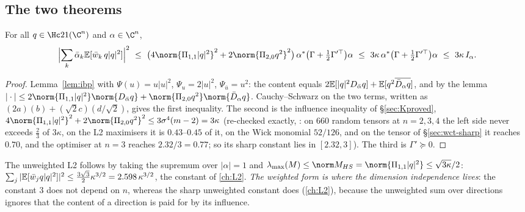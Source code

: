 \subsection{The two theorems}\label{sec:wct-thm}
\begin{theorem}\label{thm:W}
For all $q\in\Hc21(\C^n)$ and $\alpha\in\C^n$,
\[
\Bigl|\sum_k\bar\alpha_k\E[\bar w_k\,q|q|^2]\Bigr|^2\ \le\ \bigl(4\norm{\Pi_{1,1}|q|^2}^2+2\norm{\Pi_{2,0}q^2}^2\bigr)\,\alpha^*\bigl(\Gamma+\tfrac12\Gamma'^{\top}\bigr)\alpha\ \le\ 3\kappa\,\alpha^*\bigl(\Gamma+\tfrac12\Gamma'^{\top}\bigr)\alpha\ \le\ 3\kappa\,I_\alpha .
\]
\end{theorem}
\begin{proof}
Lemma~\ref{lem:ibp} with $\Psi(u)=u|u|^2$, $\Psi_u=2|u|^2$, $\Psi_{\bar u}=u^2$: the content equals $2\mathbb E[|q|^2D_{\bar\alpha}q]+\mathbb E[q^2\overline{\bar D_\alpha q}]$, and by the lemma
$|\cdot|\le2\norm{\Pi_{1,1}|q|^2}\norm{D_{\bar\alpha}q}+\norm{\Pi_{2,0}q^2}\norm{\bar D_\alpha q}$. Cauchy--Schwarz on the two terms, written as
$(2a)(b)+(\sqrt2c)(d/\sqrt2)$, gives the first inequality. The second is the influence inequality of \S\ref{sec:Kproved}, $4\norm{\Pi_{1,1}|q|^2}^2+2\norm{\Pi_{2,0}q^2}^2\le3\sigma^4(m-2)=3\kappa$
(re-checked exactly, : on $660$ random tensors at $n=2,3,4$ the left side never exceeds $\frac23$ of $3\kappa$, on the L2 maximisers it is $0.43$--$0.45$ of it, on the Wick monomial $52/126$, and on the tensor of \S\ref{sec:wct-sharp} it reaches $0.70$, and the optimiser at $n=3$ reaches $2.32/3=0.77$; so its sharp constant lies in $[2.32,3]$). The third is $\Gamma'\succeq0$.
\end{proof}
The unweighted L2 follows by taking the supremum over $|\alpha|=1$ and $\lambda_{\max}(M)\le\norm M_{HS}=\norm{\Pi_{1,1}|q|^2}\le\sqrt{3\kappa}/2$:
$\sum_j|\mathbb E[\bar w_jq|q|^2]|^2\le\frac{3\sqrt3}2\kappa^{3/2}=2.598\,\kappa^{3/2}$, the constant of \autoref{ch:L2}. \emph{The weighted form is where the dimension independence lives}: the
constant $3$ does not depend on $n$, whereas the sharp unweighted constant does (\autoref{ch:L2}), because the unweighted sum over directions ignores that the content of a direction is
paid for by its influence.

